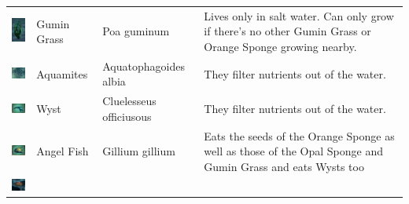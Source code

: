 \documentclass[11pt,twoside,a4paper]{article}
\begin{document}
\begin{longtable}{ p{1.60cm} p{1.95cm} p{2.55cm} p{11.00cm} }
	\begin{minipage}[ht]{1.55cm} \includegraphics[width=1.00cm]{img/seagrass.jpg} \end{minipage}		
																&	Gumin Grass		&	Poa guminum		
																&	Lives only in salt water. Can only grow if there's no other Gumin Grass or Orange Sponge growing nearby.	\\
	\begin{minipage}[ht]{1.55cm} \includegraphics[width=1.50cm]{img/mites.jpg} \end{minipage}		
																&	Aquamites		&	Aquatophagoides albia		
																&	They filter nutrients out of the water.	\\
	\begin{minipage}[ht]{1.55cm} \includegraphics[width=1.50cm]{img/wyst.jpg} \end{minipage}		
																&	Wyst			&	Cluelesseus \newline officiusous		
																&	They filter nutrients out of the water.	\\
	\begin{minipage}[ht]{1.55cm} \includegraphics[width=1.50cm]{img/handlef.jpg} \end{minipage}		
																&	Angel Fish		&	Gillium gillium		
																&	Eats the seeds of the Orange Sponge as well as those of the Opal Sponge and Gumin Grass and eats Wysts too	\\
	\begin{minipage}[ht]{1.55cm} \includegraphics[width=1.50cm]{img/clownf.jpg} \end{minipage}		

\end{longtable}
\end{document}

